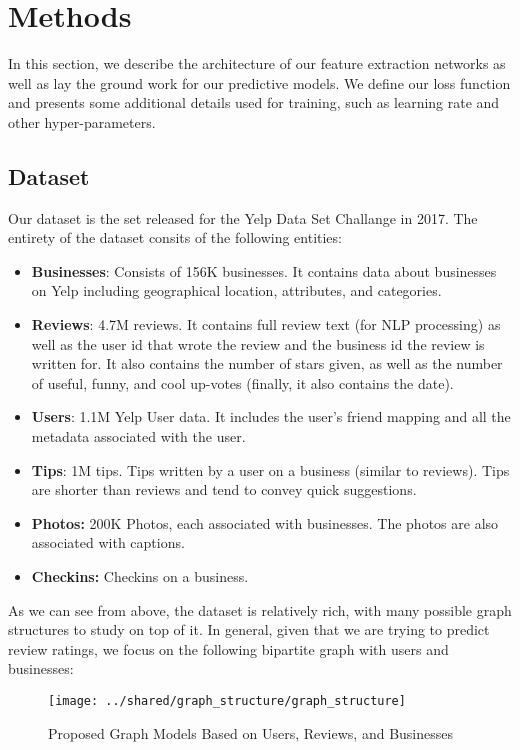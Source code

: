 \documentclass[letterpaper, 11 pt, conference]{ieeeconf}  %
\begin{document}
\section{Methods}
In this section, we describe the architecture of our feature extraction networks as well as lay the ground work for our predictive models. We define our loss function and presents some additional details used for training, such as learning rate and other hyper-parameters.

\subsection{Dataset}
Our dataset is the set released for the Yelp Data Set Challange in 2017. The entirety of the dataset consits of the following entities:
\begin{itemize}
\item \textbf{Businesses}: Consists of 156K businesses. It contains data about businesses on Yelp including geographical location, attributes, and categories.
\item \textbf{Reviews}: 4.7M reviews. It contains full review text (for NLP processing) as well as the user id that wrote the review and the business id the review is written for. It also contains the number of stars given, as well as the number of useful, funny, and cool up-votes (finally, it also contains the date).
\item \textbf{Users}: 1.1M Yelp User data. It includes the user's friend mapping and all the metadata associated with the user.
\item \textbf{Tips}: 1M tips. Tips written by a user on a business (similar to reviews). Tips are shorter than reviews and tend to convey quick suggestions.
\item \textbf{Photos:} 200K Photos, each associated with businesses. The photos are also associated with captions.
\item \textbf{Checkins:} Checkins on a business.
\end{itemize}

As we can see from above, the dataset is relatively rich, with many possible graph structures to study on top of it. In general, given that we are trying to predict review ratings, we focus on the following bipartite graph with users and businesses:

\begin{figure}
\centering
\texttt{[image: ../shared/graph\_structure/graph\_structure]}
\caption{Proposed Graph Models Based on Users, Reviews, and Businesses}
\label{fig:graph_structure}
\end{figure}
\end{document}
